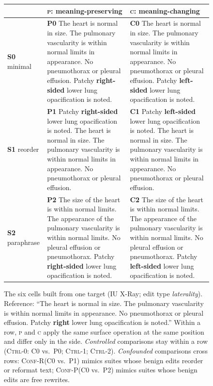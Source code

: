 \documentclass[11pt]{article}
\newcommand{\Pc}{\textsc{p}\xspace}
\newcommand{\Cc}{\textsc{c}\xspace}
\newcommand{\ctrlz}{\textsc{Ctrl-0}\xspace}
\newcommand{\ctrlo}{\textsc{Ctrl-1}\xspace}
\newcommand{\ctrlt}{\textsc{Ctrl-2}\xspace}
\newcommand{\confr}{\textsc{Conf-R}\xspace}
\newcommand{\confp}{\textsc{Conf-P}\xspace}
\newcommand{\chg}[1]{\textbf{#1}}
\begin{document}
\begin{figure}[t]
\centering
\small
\setlength{\tabcolsep}{4pt}
\begin{tabular}{p{}p{}p{}}
\toprule
 & \textbf{\Pc: meaning-preserving} & \textbf{\Cc: meaning-changing} \\
\midrule
\textbf{S0} minimal &
\textbf{P0}\; The heart is normal in size. The pulmonary vascularity is within normal limits in appearance. No pneumothorax or pleural effusion. Patchy \chg{right-sided} lower lung opacification is noted. &
\textbf{C0}\; The heart is normal in size. The pulmonary vascularity is within normal limits in appearance. No pneumothorax or pleural effusion. Patchy \chg{left-sided} lower lung opacification is noted. \\
\addlinespace
\textbf{S1} reorder &
\textbf{P1}\; Patchy \chg{right-sided} lower lung opacification is noted. The heart is normal in size. The pulmonary vascularity is within normal limits in appearance. No pneumothorax or pleural effusion. &
\textbf{C1}\; Patchy \chg{left-sided} lower lung opacification is noted. The heart is normal in size. The pulmonary vascularity is within normal limits in appearance. No pneumothorax or pleural effusion. \\
\addlinespace
\textbf{S2} paraphrase &
\textbf{P2}\; The size of the heart is within normal limits. The appearance of the pulmonary vascularity is within normal limits. No pleural effusion or pneumothorax. Patchy \chg{right-sided} lower lung opacification is noted. &
\textbf{C2}\; The size of the heart is within normal limits. The appearance of the pulmonary vascularity is within normal limits. No pleural effusion or pneumothorax. Patchy \chg{left-sided} lower lung opacification is noted. \\
\bottomrule
\end{tabular}
\caption{The six cells built from one target (IU X-Ray; edit type \emph{laterality}). Reference: ``The heart is normal in size. The pulmonary vascularity is within normal limits in appearance. No pneumothorax or pleural effusion. Patchy \chg{right} lower lung opacification is noted.'' Within a row, \Pc and \Cc apply the same surface operation at the same position and differ only in the side. \emph{Controlled} comparisons stay within a row (\ctrlz: C0 vs.\ P0; \ctrlo; \ctrlt). \emph{Confounded} comparisons cross rows: \confr (C0 vs.\ P1) mimics suites whose benign edits reorder or reformat text; \confp (C0 vs.\ P2) mimics suites whose benign edits are free rewrites.}
\label{fig:design}
\end{figure}
\end{document}
